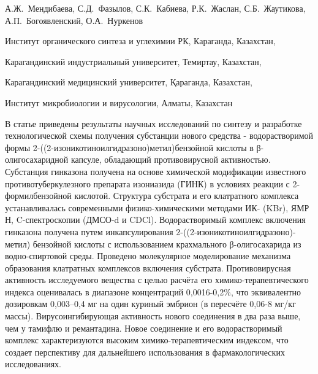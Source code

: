 
\begin{header}

А.Ж.~Мендибаева,
С.Д.~Фазылов\envelope,
С.К.~Кабиева,
Р.К.~Жаслан,
С.Б.~Жаутикова,
А.П.~Богоявленский,
О.А.~Нуркенов
\end{header}

\begin{affil}
Институт органического синтеза и углехимии РК, Караганда, Казахстан,

Карагандинский индустриальный университет, Темиртау, Казахстан,

Карагандинский медицинский университет, Қараганда, Казахстан,

 Институт микробиологии и вирусологии, Алматы, Казахстан

\end{affil}

В статье приведены результаты научных исследований по синтезу и
разработке технологической схемы получения субстанции нового средства -
водорастворимой формы 2-((2-изоникотиноилгид\-разоно)метил)бензойной
кислоты в β-олигосахаридной капсуле, обладающий противовирусной
активностью. Субстанция гинказона получена на основе химической
модификации известного противотуберкулезного препарата изониазида (ГИНК)
в условиях реакции с 2-формилбензойной кислотой. Структура субстрата и
его клатратного комплекса устанавливалась современными
физико-химическими методами ИК- (KBr), ЯМР Н,
C-спектроскопии (ДМСО-d и
CDCl). Водорастворимый комплекс включения гинказона
получена путем инкапсулирования 2-((2-изоникотиноилгид\-разоно)- метил)
бензойной кислоты с использованием крахмального β-олигосахарида из
водно-спиртовой среды. Проведено молекулярное моделирование механизма
образования клатратных комплексов включения субстрата. Противовирусная
активность исследуемого вещества с целью расчёта его
химико-терапевтического индекса оценивалась в диапазоне концентраций
0,0016-0,2\%, что эквивалентно дозировкам 0,003--0,4 мг на один куриный
эмбрион (в пересчёте 0,06-8 мг/кг массы). Вирусоингибирующая активность
нового соединения в два раза выше, чем у тамифлю и ремантадина. Новое
соединение и его водорастворимый комплекс характеризуются высоким
химико-терапевтическим индексом, что создает перспективу для дальнейшего
использования в фармакологических исследованиях.

